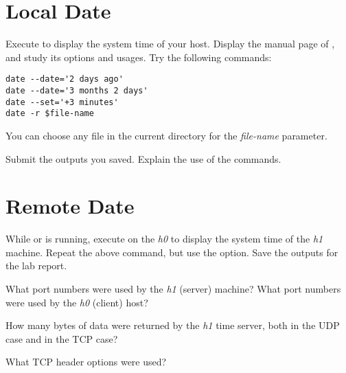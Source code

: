 \documentclass{../UTNetLab}
\begin{document}
\section{Local Date}
    Execute  to display the system time of your host.
    Display the manual page of , and study its options and usages.
    Try the following  commands:

    \begin{lstlisting}[emph={$file-name}]
date --date='2 days ago'
date --date='3 months 2 days'
date --set='+3 minutes'
date -r $file-name
    \end{lstlisting}
    You can choose any file in the current directory for the \textit{file-name} parameter.

    \begin{report}
        \item Submit the  outputs you saved.
            Explain the use of the commands.
    \end{report}

\section{Remote Date}
    While  or  is running, execute  on the \textit{h0} to display the system time of the \textit{h1} machine.
    Repeat the above  command, but use the  option.
    Save the  outputs for the lab report.

    \begin{report}
        \item What port numbers were used by the \textit{h1} (server) machine?
            What port numbers were used by the \textit{h0} (client) host?

        \item How many bytes of data were returned by the \textit{h1} time server, both in the UDP case and in the TCP case?

        \item What TCP header options were used?
    \end{report}
\end{document}
